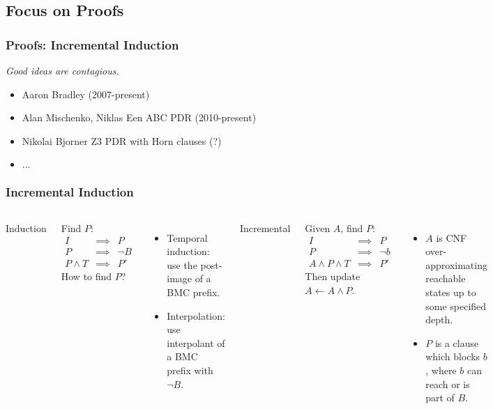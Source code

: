\documentclass{beamer}
\begin{document}
\subsection{Focus on Proofs}
\begin{frame}
	\frametitle{Proofs: Incremental Induction}
	\begin{center}
		\em{Good ideas are contagious.}
	\end{center}
	\begin{itemize}
		\item Aaron Bradley (2007-present)
		\item Alan Mischenko, Niklas Een ABC PDR (2010-present)
		\item Nikolai Bjorner Z3 PDR with Horn clauses (?)
		\item $\ldots$
	\end{itemize}
\end{frame}

\begin{frame}
	\frametitle{Incremental Induction}
	\begin{columns}
		\begin{center}Induction\end{center}
		Find $P$:
		\begin{align*}
			I & \implies & P\\
			P & \implies & \neg B\\
			P \wedge T & \implies & P'
		\end{align*}
		How to find $P$?
		\begin{itemize}
			\item Temporal induction: use the post-image of a BMC prefix.
			\item Interpolation: use interpolant of a BMC prefix with $\neg B$.
		\end{itemize}
		\begin{center}Incremental\end{center}
		Given $A$, find $P$:
		\begin{align*}
			I & \implies & P\\
			P & \implies & \neg b\\
			A \wedge P \wedge T & \implies & P'
		\end{align*}
		Then update $A \leftarrow A \wedge P$.

		\begin{itemize}
			\item $A$ is CNF over-approximating reachable states up to some specified depth.
			\item $P$ is a clause which blocks $b$, where $b$ can reach or is part of $B$.
		\end{itemize}
	\end{columns}
\end{frame}
\end{document}

